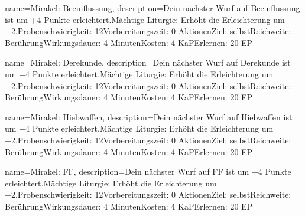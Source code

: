 {
    name={Mirakel: Beeinflussung},
    description={Dein nächster Wurf auf Beeinflussung ist um +4 Punkte erleichtert.\newline Mächtige Liturgie: Erhöht die Erleichterung um +2.\newline Probenschwierigkeit: 12\newline Vorbereitungszeit: 0 Aktionen\newline Ziel: selbst\newline Reichweite: Berührung\newline Wirkungsdauer: 4 Minuten\newline Kosten: 4 KaP\newline Erlernen: 20 EP}
}


{
    name={Mirakel: Derekunde},
    description={Dein nächster Wurf auf Derekunde ist um +4 Punkte erleichtert.\newline Mächtige Liturgie: Erhöht die Erleichterung um +2.\newline Probenschwierigkeit: 12\newline Vorbereitungszeit: 0 Aktionen\newline Ziel: selbst\newline Reichweite: Berührung\newline Wirkungsdauer: 4 Minuten\newline Kosten: 4 KaP\newline Erlernen: 20 EP}
}


{
    name={Mirakel: Hiebwaffen},
    description={Dein nächster Wurf auf Hiebwaffen ist um +4 Punkte erleichtert.\newline Mächtige Liturgie: Erhöht die Erleichterung um +2.\newline Probenschwierigkeit: 12\newline Vorbereitungszeit: 0 Aktionen\newline Ziel: selbst\newline Reichweite: Berührung\newline Wirkungsdauer: 4 Minuten\newline Kosten: 4 KaP\newline Erlernen: 20 EP}
}


{
    name={Mirakel: FF},
    description={Dein nächster Wurf auf FF ist um +4 Punkte erleichtert.\newline Mächtige Liturgie: Erhöht die Erleichterung um +2.\newline Probenschwierigkeit: 12\newline Vorbereitungszeit: 0 Aktionen\newline Ziel: selbst\newline Reichweite: Berührung\newline Wirkungsdauer: 4 Minuten\newline Kosten: 4 KaP\newline Erlernen: 20 EP}
}


